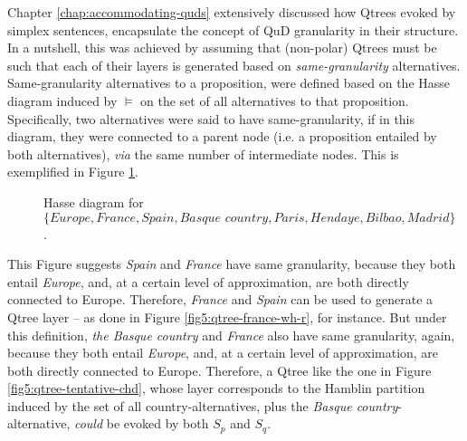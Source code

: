 Chapter \ref{chap:accommodating-quds} extensively discussed how Qtrees evoked by simplex sentences, encapsulate the concept of QuD granularity in their structure. In a nutshell, this was achieved by assuming that (non-polar) Qtrees must be such that each of their layers is generated based on \textit{same-granularity} alternatives. Same-granularity alternatives to a proposition, were defined based on the Hasse diagram induced by $\vDash$ on the set of all alternatives to that proposition. Specifically, two alternatives were said to have same-granularity, if in this diagram, they were connected to a parent node (i.e. a proposition entailed by both alternatives), \textit{via} the same number of intermediate nodes. This is exemplified in Figure \ref{fig5:hasse-france-spain}. 

\begin{figure}[H]
	\centering
	\caption[]{Hasse diagram for $\lbrace \textit{Europe}, \textit{France}, \textit{Spain}, \textit{Basque country}, \textit{Paris}, \textit{Hendaye}, \textit{Bilbao}, \textit{Madrid} \rbrace$.}\label{fig5:hasse-france-spain}
\end{figure}

This Figure suggests \textit{Spain} and \textit{France} have same granularity, because they both entail \textit{Europe}, and, at a certain level of approximation, are both directly connected to Europe. Therefore, \textit{France} and \textit{Spain} can be used to generate a Qtree layer -- as done in Figure \ref{fig5:qtree-france-wh-r}, for instance. But under this definition, \textit{the Basque country} and \textit{France} also have same granularity, again, because they both entail \textit{Europe}, and, at a certain level of approximation, are both directly connected to Europe. Therefore, a Qtree like the one in Figure \ref{fig5:qtree-tentative-chd}, whose layer corresponds to the Hamblin partition induced by the set of all country-alternatives, plus the \textit{Basque country}-alternative, \textit{could} be evoked by both $S_p$ and $S_q$.\\

